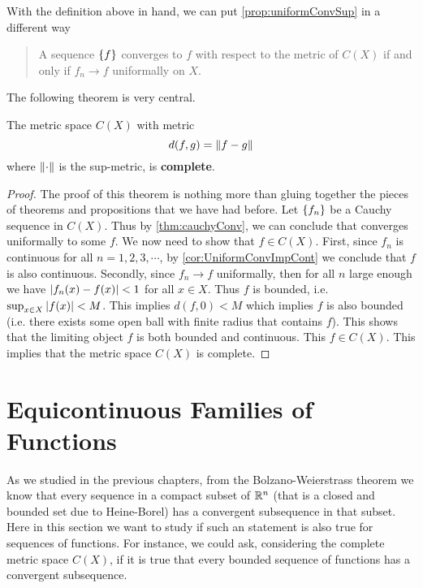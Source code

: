 With the definition above in hand, we can put \autoref{prop:uniformConvSup} in a different way

\begin{quote}
	A sequence $ \{f\} $ converges to $ f $ with respect to the metric of $ C(X) $ if and only if $ f_n \to f $ uniformally on $ X $.
\end{quote}
The following theorem is very central.
\begin{theorem}
	The metric space $  C(X) $ with metric
	\[ d(f,g) = \norm{f-g} \]
	where $ \norm{\cdot} $ is the sup-metric, is \textbf{complete}.
\end{theorem}
\begin{proof}
	The proof of this theorem is nothing more than gluing together the pieces of theorems and propositions that we have had before. Let $ \{f_n\} $ be a Cauchy sequence in $ C(X) $. Thus by \autoref{thm:cauchyConv}, we can conclude that converges uniformally to some $ f $. We now need to show that $  f\in C(X) $. First, since $ f_n $ is continuous for all $ n = 1,2,3,\cdots $, by \autoref{cor:UniformConvImpCont} we conclude that $ f $ is also continuous. Secondly, since $ f_n \to f $ uniformally, then for all $ n $ large enough we have
	$ |f_n(x) - f(x)| < 1 $ for all $  x\in X $. Thus $ f $ is bounded, i.e. $ \sup_{x\in X}|f(x)| < M $. This implies $ d(f,0) < M $ which implies $ f $ is also bounded (i.e. there exists some open ball with finite radius that contains $ f $). This shows that the limiting object $ f $ is both bounded and continuous. This $ f \in C(X) $. This implies that the metric space $ C(X) $ is complete. 
\end{proof}


\section{Equicontinuous Families of Functions}
As we studied in the previous chapters, from the Bolzano-Weierstrass theorem we know that every sequence in a compact subset of $ \mathbb{R}^n $ (that is a closed and bounded set due to Heine-Borel) has a convergent subsequence in that subset. Here in this section we want to study if such an statement is also true for sequences of functions. For instance, we could ask, considering the complete metric space $ C(X) $, if it is true that every bounded sequence of functions has a convergent subsequence.

